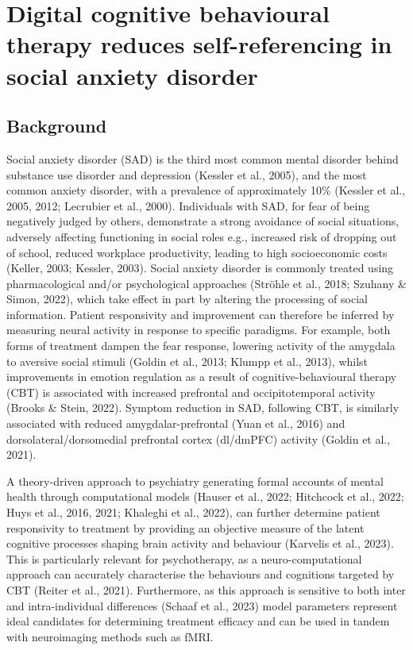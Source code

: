 \documentclass[12pt,a4paper,oneside,]{book} %
\begin{document}
\section{Digital cognitive behavioural therapy reduces self-referencing in social anxiety disorder}\label{digital-cognitive-behavioural-therapy-reduces-self-referencing-in-social-anxiety-disorder}

\subsection{Background}\label{background-1}

Social anxiety disorder (SAD) is the third most common mental disorder behind substance use disorder and depression (Kessler et al., 2005), and the most common anxiety disorder, with a prevalence of approximately 10\% (Kessler et al., 2005, 2012; Lecrubier et al., 2000). Individuals with SAD, for fear of being negatively judged by others, demonstrate a strong avoidance of social situations, adversely affecting functioning in social roles e.g., increased risk of dropping out of school, reduced workplace productivity, leading to high socioeconomic costs (Keller, 2003; Kessler, 2003). Social anxiety disorder is commonly treated using pharmacological and/or psychological approaches (Ströhle et al., 2018; Szuhany \& Simon, 2022), which take effect in part by altering the processing of social information. Patient responsivity and improvement can therefore be inferred by measuring neural activity in response to specific paradigms. For example, both forms of treatment dampen the fear response, lowering activity of the amygdala to aversive social stimuli (Goldin et al., 2013; Klumpp et al., 2013), whilst improvements in emotion regulation as a result of cognitive-behavioural therapy (CBT) is associated with increased prefrontal and occipitotemporal activity (Brooks \& Stein, 2022). Symptom reduction in SAD, following CBT, is similarly associated with reduced amygdalar-prefrontal (Yuan et al., 2016) and dorsolateral/dorsomedial prefrontal cortex (dl/dmPFC) activity (Goldin et al., 2021).

A theory-driven approach to psychiatry generating formal accounts of mental health through computational models (Hauser et al., 2022; Hitchcock et al., 2022; Huys et al., 2016, 2021; Khaleghi et al., 2022), can further determine patient responsivity to treatment by providing an objective measure of the latent cognitive processes shaping brain activity and behaviour (Karvelis et al., 2023). This is particularly relevant for psychotherapy, as a neuro-computational approach can accurately characterise the behaviours and cognitions targeted by CBT (Reiter et al., 2021). Furthermore, as this approach is sensitive to both inter and intra-individual differences (Schaaf et al., 2023) model parameters represent ideal candidates for determining treatment efficacy and can be used in tandem with neuroimaging methods such as fMRI.
\end{document}
